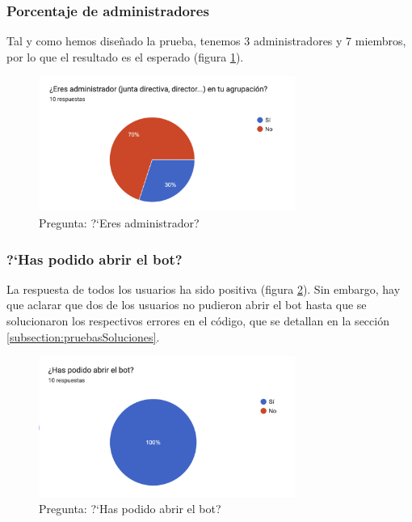 \subsubsection{Porcentaje de administradores}

Tal y como hemos diseñado la prueba, tenemos 3 administradores y 7 miembros, por lo que el resultado es el esperado (figura \ref{fig:graficoAdministradores}).

\begin{figure}[h]
\centering
\includegraphics[width=0.75\textwidth]{imagenes/pruebas/eres_administrador.png}
\caption{Pregunta: ?`Eres administrador?}
\label{fig:graficoAdministradores}
\end{figure}

\subsubsection{?`Has podido abrir el bot?}

La respuesta de todos los usuarios ha sido positiva (figura \ref{fig:graficoAbrir}). Sin embargo, hay que aclarar que dos de los usuarios no pudieron abrir el bot hasta que se solucionaron los respectivos errores en el código, que se detallan en la sección \ref{subsection:pruebasSoluciones}.

\begin{figure}[h]
\centering
\includegraphics[width=0.75\textwidth]{imagenes/pruebas/has_podido_abrir.png}
\caption{Pregunta: ?`Has podido abrir el bot?}
\label{fig:graficoAbrir}
\end{figure}


